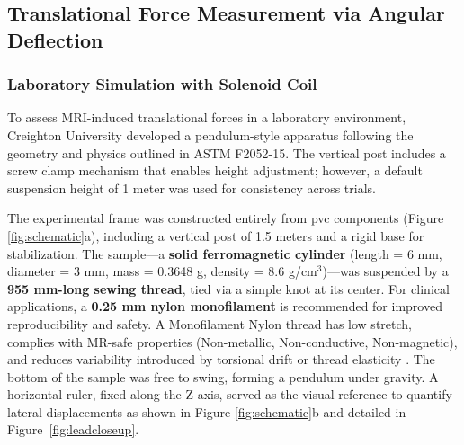 \subsection{Translational Force Measurement via Angular Deflection}

\subsubsection{Laboratory Simulation with Solenoid Coil}

To assess MRI-induced translational forces in a laboratory environment, Creighton University developed a pendulum-style apparatus following the geometry and physics outlined in ASTM F2052-15\cite{astmF2052}. The vertical post includes a screw clamp mechanism that enables height adjustment; however, a default suspension height of 1 meter was used for consistency across trials.

The experimental frame was constructed entirely from \gls{pvc} components (Figure \ref{fig:schematic}a), including a vertical post of 1.5 meters and a rigid base for stabilization. The sample—a \textbf{solid ferromagnetic cylinder} (length = 6 mm, diameter = 3 mm, mass = 0.3648 g, density = 8.6 g/cm$^3$)—was suspended by a \textbf{955 mm-long sewing thread}, tied via a simple knot at its center. For clinical applications, a \textbf{0.25 mm nylon monofilament} is recommended for improved reproducibility and safety. A Monofilament Nylon thread has low stretch,  complies with MR-safe properties (Non-metallic, Non-conductive, Non-magnetic), and reduces variability introduced by torsional drift or thread elasticity  \cite{stoianovici2024, astmF2052}. The bottom of the sample was free to swing, forming a pendulum under gravity. A horizontal ruler, fixed along the Z-axis, served as the visual reference to quantify lateral displacements as shown in Figure \ref{fig:schematic}b and detailed in Figure~\ref{fig:leadcloseup}. 


